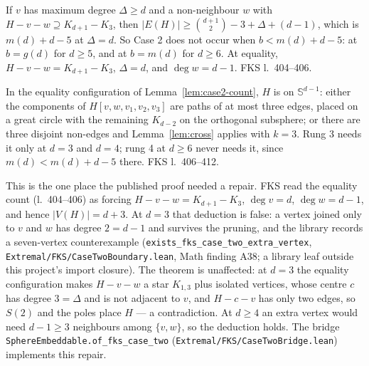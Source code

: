 \begin{lemma}
  \label{lem:case2-count}
  \leanok
  If $v$ has maximum degree $\Delta \ge d$ and a non-neighbour $w$ with
  $H - v - w \supseteq K_{d+1} - K_3$, then $\lvert E(H)\rvert \ge \binom{d+1}{2} - 3 +
  \Delta + (d - 1)$, which is $m(d) + d - 5$ at $\Delta = d$. So Case 2 does not occur when
  $b < m(d) + d - 5$: at $b = g(d)$ for $d \ge 5$, and at $b = m(d)$ for $d \ge 6$. At
  equality, $H - v - w = K_{d+1} - K_3$, $\Delta = d$, and $\deg w = d - 1$. FKS
  l.~404--406.
\end{lemma}

\begin{lemma}
  \label{lem:case2-place}
  \leanok
  In the equality configuration of Lemma~\ref{lem:case2-count}, $H$ is on
  $\mathbb{S}^{d-1}$: either the components of $H[v, w, v_1, v_2, v_3]$ are paths of at most
  three edges, placed on a great circle with the remaining $K_{d-2}$ on the orthogonal
  subsphere; or there are three disjoint non-edges and Lemma~\ref{lem:cross} applies with
  $k = 3$. Rung 3 needs it only at $d = 3$ and $d = 4$; rung 4 at $d \ge 6$ never needs it,
  since $m(d) < m(d) + d - 5$ there. FKS l.~406--412.

  This is the one place the published proof needed a repair. FKS read the equality count
  (l.~404--406) as forcing $H - v - w = K_{d+1} - K_3$, $\deg v = d$, $\deg w = d - 1$, and
  hence $\lvert V(H)\rvert = d + 3$. At $d = 3$ that deduction is false: a vertex joined
  only to $v$ and $w$ has degree $2 = d - 1$ and survives the pruning, and the library
  records a seven-vertex counterexample
  (\texttt{exists\_fks\_case\_two\_extra\_vertex}, \texttt{Extremal/FKS/CaseTwoBoundary.lean},
  Math finding A38; a library leaf outside this project's import closure). The theorem is
  unaffected: at $d = 3$ the equality configuration makes $H - v - w$ a star $K_{1,3}$ plus
  isolated vertices, whose centre $c$ has degree $3 = \Delta$ and is not adjacent to $v$,
  and $H - c - v$ has only two edges, so $S(2)$ and the poles place $H$ --- a
  contradiction. At $d \ge 4$ an extra vertex would need $d - 1 \ge 3$ neighbours among
  $\{v, w\}$, so the deduction holds. The bridge \texttt{SphereEmbeddable.of\_fks\_case\_two}
  (\texttt{Extremal/FKS/CaseTwoBridge.lean}) implements this repair.
\end{lemma}

